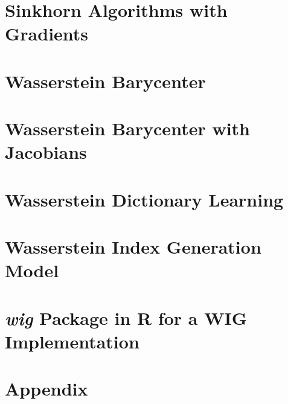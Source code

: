 \documentclass[oneside,12pt,letterpaper]{article}
\begin{document}
\section{Sinkhorn Algorithms with Gradients}\label{sec:sinkhorn-gradient}


\section{Wasserstein Barycenter}\label{sec:wasserstein-barycenter}


\section{Wasserstein Barycenter with Jacobians}\label{sec:barycenter-jacobian}


\section{Wasserstein Dictionary Learning}\label{sec:wdl}


\section{Wasserstein Index Generation Model}\label{sec:wig-model}
\citet{xie2020}

\section{\textbf{\textit{wig}} Package in R for a WIG Implementation}\label{sec:wig-package}
\citet{xie2020a}


% 

\newpage
{}
\printbibliography

\newpage
\section*{Appendix}
\label{appendix}
\appendix
\setcounter{secnumdepth}{0}


\end{document}
